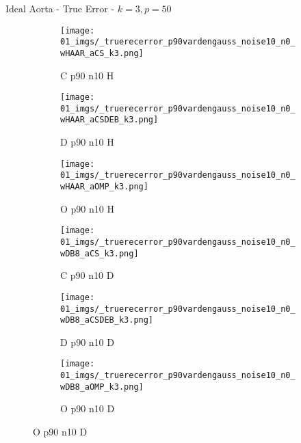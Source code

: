 \begin{frame}{Ideal Aorta - True Error - $k=3,p=50$}{}
\begin{figure}
\begin{subfigure}{0.13\textwidth}
\texttt{[image: 01\_imgs/\_truerecerror\_p90vardengauss\_noise10\_n0\_wHAAR\_aCS\_k3.png]}
\caption*{\tiny C p90 n10 H}
\end{subfigure}
\begin{subfigure}{0.13\textwidth}
\texttt{[image: 01\_imgs/\_truerecerror\_p90vardengauss\_noise10\_n0\_wHAAR\_aCSDEB\_k3.png]}
\caption*{\tiny D p90 n10 H}
\end{subfigure}
\begin{subfigure}{0.13\textwidth}
\texttt{[image: 01\_imgs/\_truerecerror\_p90vardengauss\_noise10\_n0\_wHAAR\_aOMP\_k3.png]}
\caption*{\tiny O p90 n10 H}
\end{subfigure}
\begin{subfigure}{0.13\textwidth}
\texttt{[image: 01\_imgs/\_truerecerror\_p90vardengauss\_noise10\_n0\_wDB8\_aCS\_k3.png]}
\caption*{\tiny C p90 n10 D}
\end{subfigure}
\begin{subfigure}{0.13\textwidth}
\texttt{[image: 01\_imgs/\_truerecerror\_p90vardengauss\_noise10\_n0\_wDB8\_aCSDEB\_k3.png]}
\caption*{\tiny D p90 n10 D}
\end{subfigure}
\begin{subfigure}{0.13\textwidth}
\texttt{[image: 01\_imgs/\_truerecerror\_p90vardengauss\_noise10\_n0\_wDB8\_aOMP\_k3.png]}
\caption*{\tiny O p90 n10 D}
\end{subfigure}

\vspace{5pt}


\end{figure}
\end{frame}
